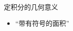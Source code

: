 \begin{frame}{定积分的几何意义}\pause 
	\linespread{1.2}
	\begin{itemize}
	  \item {\bb “带有符号的面积”}\pause 
	\end{itemize}
	\begin{center}
		\pause 
		\pause 

\end{center}
\end{frame}
